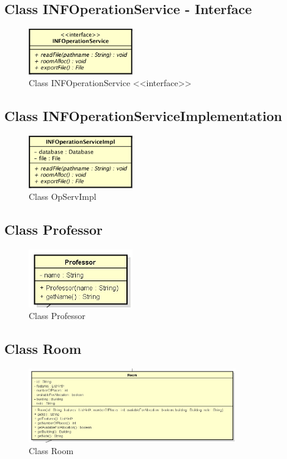 \documentclass[a4paper]{article}
\begin{document}
\subsection{Class INFOperationService - Interface}
\begin{figure}[H]
\centering
\includegraphics[width=0.4\textwidth]{OpServ.png}
\caption{\label{fig:OpServ}Class INFOperationService <<interface>>}
\end{figure}


\subsection{Class INFOperationServiceImplementation}
\begin{figure}[H]
\centering
\includegraphics[width=0.4\textwidth]{OpServImpl.png}
\caption{\label{fig:OpServImpl}Class OpServImpl}
\end{figure}


\subsection{Class Professor}
\begin{figure}[H]
\centering
\includegraphics[width=0.4\textwidth]{Professor.jpg}
\caption{\label{fig:Professor}Class Professor}
\end{figure}


\subsection{Class Room}
\begin{figure}[H]
\centering
\includegraphics[width=0.8\textwidth]{Room.jpg}
\caption{\label{fig:room}Class Room}
\end{figure}
\end{document}
